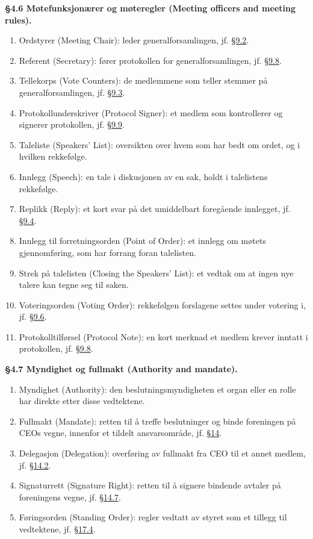 \documentclass{../../../Common/Latex/Templates/rapport}
\begin{document}
\textbf{\S 4.6 Møtefunksjonærer og møteregler (Meeting officers and meeting rules).}\label{bylaw:4.6}
\begin{enumerate}
  \item Ordstyrer (Meeting Chair): leder generalforsamlingen, jf. \hyperref[bylaw:9.2]{\S 9.2}.
  \item Referent (Secretary): fører protokollen for generalforsamlingen, jf. \hyperref[bylaw:9.8]{\S 9.8}.
  \item Tellekorps (Vote Counters): de medlemmene som teller stemmer på generalforsamlingen, jf. \hyperref[bylaw:9.3]{\S 9.3}.
  \item Protokollunderskriver (Protocol Signer): et medlem som kontrollerer og signerer protokollen, jf. \hyperref[bylaw:9.9]{\S 9.9}.
  \item Taleliste (Speakers' List): oversikten over hvem som har bedt om ordet, og i hvilken rekkefølge.
  \item Innlegg (Speech): en tale i diskusjonen av en sak, holdt i talelistens rekkefølge.
  \item Replikk (Reply): et kort svar på det umiddelbart foregående innlegget, jf. \hyperref[bylaw:9.4]{\S 9.4}.
  \item Innlegg til forretningsorden (Point of Order): et innlegg om møtets gjennomføring, som har forrang foran talelisten.
  \item Strek på talelisten (Closing the Speakers' List): et vedtak om at ingen nye talere kan tegne seg til saken.
  \item Voteringsorden (Voting Order): rekkefølgen forslagene settes under votering i, jf. \hyperref[bylaw:9.6]{\S 9.6}.
  \item Protokolltilførsel (Protocol Note): en kort merknad et medlem krever inntatt i protokollen, jf. \hyperref[bylaw:9.8]{\S 9.8}.
\end{enumerate}

\textbf{\S 4.7 Myndighet og fullmakt (Authority and mandate).}\label{bylaw:4.7}
\begin{enumerate}
  \item Myndighet (Authority): den beslutningsmyndigheten et organ eller en rolle har direkte etter disse vedtektene.
  \item Fullmakt (Mandate): retten til å treffe beslutninger og binde foreningen på CEOs vegne, innenfor et tildelt ansvarsområde, jf. \hyperref[bylaw:14]{\S 14}.
  \item Delegasjon (Delegation): overføring av fullmakt fra CEO til et annet medlem, jf. \hyperref[bylaw:14.2]{\S 14.2}.
  \item Signaturrett (Signature Right): retten til å signere bindende avtaler på foreningens vegne, jf. \hyperref[bylaw:14.7]{\S 14.7}.
  \item Føringsorden (Standing Order): regler vedtatt av styret som et tillegg til vedtektene, jf. \hyperref[bylaw:17.4]{\S 17.4}.
\end{enumerate}
\end{document}
